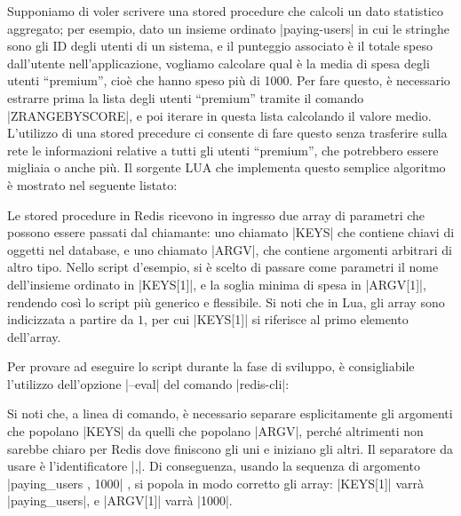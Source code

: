Supponiamo di voler scrivere una stored procedure che calcoli un dato statistico aggregato; per
esempio, dato un insieme ordinato \cverb|paying-users| in cui le stringhe sono gli ID degli utenti di
un sistema, e il punteggio associato è il totale speso dall'utente nell'applicazione, vogliamo
calcolare qual è la media di spesa degli utenti ``premium'', cioè che hanno speso più di
\SI{1000}{\EUR}. Per fare questo, è necessario estrarre prima la lista degli utenti ``premium''
tramite il comando \cverb|ZRANGEBYSCORE|, e poi iterare in questa lista calcolando il valore medio.
L'utilizzo di una stored precedure ci consente di fare questo senza trasferire sulla rete le
informazioni relative a tutti gli utenti ``premium'', che potrebbero essere migliaia o anche più. Il
sorgente LUA che implementa questo semplice algoritmo è mostrato nel seguente listato:

\medskip
{}

Le stored procedure in Redis ricevono in ingresso due array di parametri che possono essere passati
dal chiamante: uno chiamato \cverb|KEYS| che contiene chiavi di oggetti nel database, e uno chiamato
\cverb|ARGV|, che contiene argomenti arbitrari di altro tipo. Nello script d'esempio, si è scelto di
passare come parametri il nome dell'insieme ordinato in \cverb|KEYS[1]|, e la soglia minima di spesa
in \cverb|ARGV[1]|, rendendo così lo script più generico e flessibile. Si noti che in Lua, gli array
sono indicizzata a partire da $1$, per cui \cverb|KEYS[1]| si riferisce al primo elemento 
dell'array.

Per provare ad eseguire lo script durante la fase di sviluppo, è consigliabile l'utilizzo
dell'opzione \cverb|--eval| del comando \cverb|redis-cli|:


Si noti che, a linea di comando, è necessario separare esplicitamente gli argomenti che
popolano \cverb|KEYS| da quelli che popolano \cverb|ARGV|, perché altrimenti non sarebbe chiaro
per Redis dove finiscono gli uni e iniziano gli altri. Il separatore da usare è l'identificatore 
\cverbfull|,|. Di conseguenza, usando la sequenza di argomento \cverb|paying_users , 1000|
, si popola in modo corretto gli array: \cverb|KEYS[1]| varrà \cverb|paying_users|, e
\cverb|ARGV[1]| varrà \cverb|1000|.

